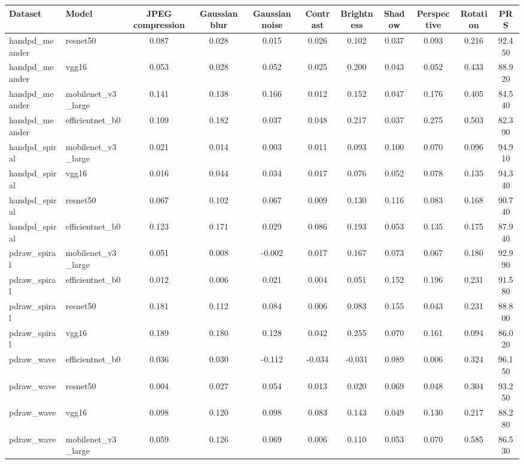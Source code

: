 \begin{tabular}{llccccccccc}
\toprule
Dataset & Model & JPEG compression & Gaussian blur & Gaussian noise & Contrast & Brightness & Shadow & Perspective & Rotation & PRS \\
\midrule
handpd_meander & resnet50 & 0.087 & 0.028 & 0.015 & 0.026 & 0.102 & 0.037 & 0.093 & 0.216 & 92.450 \\
handpd_meander & vgg16 & 0.053 & 0.028 & 0.052 & 0.025 & 0.200 & 0.043 & 0.052 & 0.433 & 88.920 \\
handpd_meander & mobilenet_v3_large & 0.141 & 0.138 & 0.166 & 0.012 & 0.152 & 0.047 & 0.176 & 0.405 & 84.540 \\
handpd_meander & efficientnet_b0 & 0.109 & 0.182 & 0.037 & 0.048 & 0.217 & 0.037 & 0.275 & 0.503 & 82.390 \\
handpd_spiral & mobilenet_v3_large & 0.021 & 0.014 & 0.003 & 0.011 & 0.093 & 0.100 & 0.070 & 0.096 & 94.910 \\
handpd_spiral & vgg16 & 0.016 & 0.044 & 0.034 & 0.017 & 0.076 & 0.052 & 0.078 & 0.135 & 94.340 \\
handpd_spiral & resnet50 & 0.067 & 0.102 & 0.067 & 0.009 & 0.130 & 0.116 & 0.083 & 0.168 & 90.740 \\
handpd_spiral & efficientnet_b0 & 0.123 & 0.171 & 0.029 & 0.086 & 0.193 & 0.053 & 0.135 & 0.175 & 87.940 \\
pdraw_spiral & mobilenet_v3_large & 0.051 & 0.008 & -0.002 & 0.017 & 0.167 & 0.073 & 0.067 & 0.180 & 92.990 \\
pdraw_spiral & efficientnet_b0 & 0.012 & 0.006 & 0.021 & 0.004 & 0.051 & 0.152 & 0.196 & 0.231 & 91.580 \\
pdraw_spiral & resnet50 & 0.181 & 0.112 & 0.084 & 0.006 & 0.083 & 0.155 & 0.043 & 0.231 & 88.800 \\
pdraw_spiral & vgg16 & 0.189 & 0.180 & 0.128 & 0.042 & 0.255 & 0.070 & 0.161 & 0.094 & 86.020 \\
pdraw_wave & efficientnet_b0 & 0.036 & 0.030 & -0.112 & -0.034 & -0.031 & 0.089 & 0.006 & 0.324 & 96.150 \\
pdraw_wave & resnet50 & 0.004 & 0.027 & 0.054 & 0.013 & 0.020 & 0.069 & 0.048 & 0.304 & 93.250 \\
pdraw_wave & vgg16 & 0.098 & 0.120 & 0.098 & 0.083 & 0.143 & 0.049 & 0.130 & 0.217 & 88.280 \\
pdraw_wave & mobilenet_v3_large & 0.059 & 0.126 & 0.069 & 0.006 & 0.110 & 0.053 & 0.070 & 0.585 & 86.530 \\
\bottomrule
\end{tabular}
